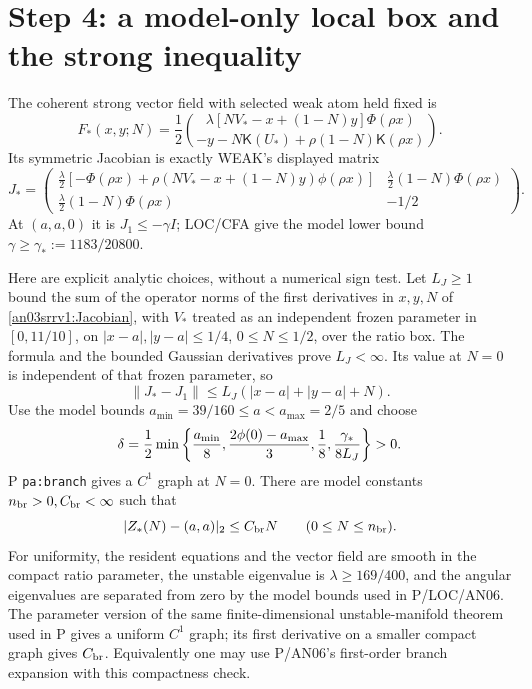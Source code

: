 \documentclass[11pt]{article}
\numberwithin{equation}{section}
\theoremstyle{remark}\newtheorem{remark}[theorem]{Remark}
\newcommand{\Kfun}{\mathsf K}\newcommand{\Ffun}{\mathsf F}
\begin{document}
\section{Step 4: a model-only local box and the strong inequality}
\label{an03srrv1:local}
The coherent strong vector field with selected weak atom held fixed is
\begin{equation}
 F_*(x,y;N)=\frac12\binom{
 \lambda[NV_*-x+(1-N)y]\Phi(\rho x)}{
 -y-N\Kfun(U_*)+\rho(1-N)\Kfun(\rho x)}.
 \label{an03srrv1:coherent}
\end{equation}
Its symmetric Jacobian is exactly WEAK's displayed matrix
\begin{equation}
 J_*=
 \begin{pmatrix}
 \frac\lambda2[-\Phi(\rho x)+\rho(NV_*-x+(1-N)y)\phi(\rho x)]
 &\frac\lambda2(1-N)\Phi(\rho x)\\
 \frac\lambda2(1-N)\Phi(\rho x)&-1/2
 \end{pmatrix}.
 \label{an03srrv1:Jacobian}
\end{equation}
At $(a,a,0)$ it is $J_1\le-\gamma I$; LOC/CFA give the
model lower bound $\gamma\ge\gamma_*:=1183/20800$.

Here are explicit analytic choices, without a numerical sign test.
Let $L_J\ge1$ bound the sum of the operator norms of the first
derivatives in $x,y,N$ of \eqref{an03srrv1:Jacobian}, with $V_*$
treated as an independent frozen parameter in $[0,11/10]$, on
$|x-a|,|y-a|\le1/4$, $0\le N\le1/2$, over the ratio box.
The formula and the bounded Gaussian derivatives prove $L_J<\infty$.
Its value at $N=0$ is independent of that frozen parameter, so
\[
 \|J_*-J_1\|\le L_J(|x-a|+|y-a|+N).
\]
Use the model bounds $a_{\min}=39/160\le a< a_{\max}=2/5$ and choose
\begin{equation}
 \delta=\frac12\min\left\{
 \frac{a_{\min}}8,\frac{2\phi(0)-a_{\max}}3,\frac18,
 \frac{\gamma_*}{8L_J}\right\}>0.
 \label{an03srrv1:delta}
\end{equation}
P \texttt{pa:branch} gives a $C^1$ graph at $N=0$.
There are model constants $n_{\rm br}>0,C_{\rm br}<\infty$ such that
\begin{equation}
 |Z_*(N)-(a,a)|_2\le C_{\rm br}N\qquad(0\le N\le n_{\rm br}).
 \label{an03srrv1:branch}
\end{equation}
For uniformity, the resident equations and the vector field are smooth
in the compact ratio parameter, the unstable eigenvalue is
$\lambda\ge169/400$, and the angular eigenvalues are separated
from zero by the model bounds used in P/LOC/AN06. The parameter
version of the same finite-dimensional unstable-manifold theorem
used in P gives a uniform $C^1$ graph; its first derivative on a
smaller compact graph gives $C_{\rm br}$. Equivalently one may use
P/AN06's first-order branch expansion with this compactness check.
\end{document}
